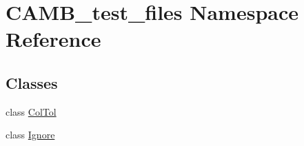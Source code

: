 \hypertarget{namespaceCAMB__test__files}{}\section{C\+A\+M\+B\+\_\+test\+\_\+files Namespace Reference}
\label{namespaceCAMB__test__files}
\subsection*{Classes}
\begin{DoxyCompactItemize}
\item 
class \mbox{\hyperlink{classCAMB__test__files_1_1ColTol}{Col\+Tol}}
\item 
class \mbox{\hyperlink{classCAMB__test__files_1_1Ignore}{Ignore}}
\end{DoxyCompactItemize}
